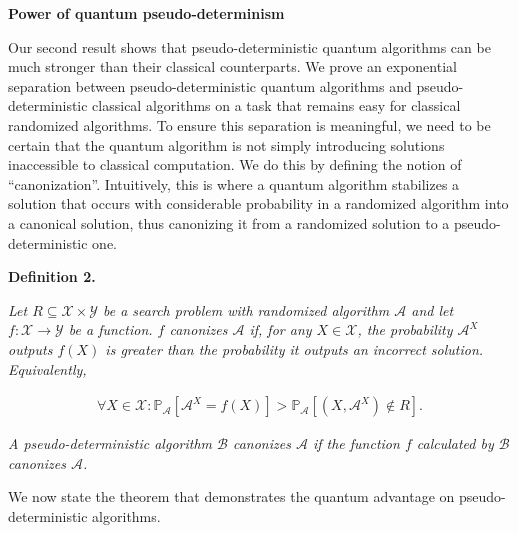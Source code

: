 \documentclass[10pt,a4paper]{article}
\begin{document}
\par\medskip\noindent\textbf{Power of quantum pseudo-determinism}\par




Our second result shows that pseudo-deterministic quantum algorithms can be much stronger than their classical counterparts. We prove an exponential separation between pseudo-deterministic quantum algorithms and pseudo-deterministic classical algorithms on a task that remains easy for classical randomized algorithms. To ensure this separation is meaningful, we need to be certain that the quantum algorithm is not simply introducing solutions inaccessible to classical computation. We do this by defining the notion of “canonization”. Intuitively, this is where a quantum algorithm stabilizes a solution that occurs with considerable probability in a randomized algorithm into a canonical solution, thus canonizing it from a randomized solution to a pseudo-deterministic one.\par





\par\medskip\noindent\textbf{
\textbf{Definition 2}\textbf{.}
}\par



\emph{Let ${R}\subseteq\mathcal{X}\times\mathcal{Y}$ be a search problem with randomized algorithm $\mathcal{A}$ and let $f:\mathcal{X}\rightarrow\mathcal{Y}$ be a function. $f$ canonizes $\mathcal{A}$ if, for any $X\in\mathcal{X}$, the probability $\mathcal{A}^{X}$ outputs $f(X)$ is greater than the probability it outputs an incorrect solution. Equivalently,}\par


\[\begin{gathered}
\forall X\in\mathcal{X}:\mathbb{P}_{\mathcal{A}}[\mathcal{A}^{X}=f(X)]>\mathbb{P}_{\mathcal{A}}[(X,\mathcal{A}^{X})\not\in{R}].
\end{gathered}\]


\emph{A pseudo-deterministic algorithm $\mathcal{B}$ canonizes $\mathcal{A}$ if the function $f$ calculated by $\mathcal{B}$ canonizes $\mathcal{A}$.}\par






We now state the theorem that demonstrates the quantum advantage on pseudo-deterministic algorithms.\par
\end{document}

